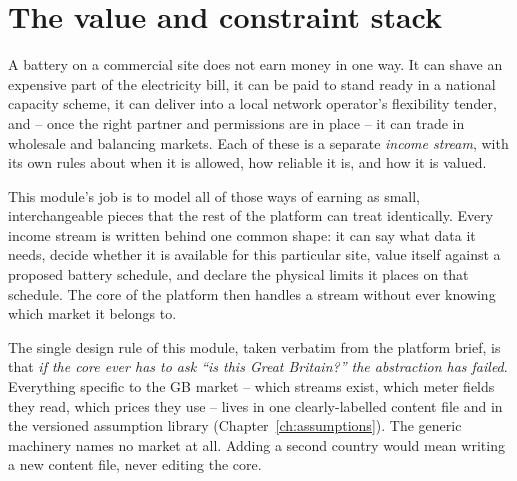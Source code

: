 \chapter{The value and constraint stack}
\label{ch:valuestack}


A battery on a commercial site does not earn money in one way. It can shave an expensive part of the electricity bill, it can be paid to stand ready in a national capacity scheme, it can deliver into a local network operator's flexibility tender, and -- once the right partner and permissions are in place -- it can trade in wholesale and balancing markets. Each of these is a separate \emph{income stream}, with its own rules about when it is allowed, how reliable it is, and how it is valued.

This module's job is to model all of those ways of earning as small, interchangeable pieces that the rest of the platform can treat identically. Every income stream is written behind one common shape: it can say what data it needs, decide whether it is available for this particular site, value itself against a proposed battery schedule, and declare the physical limits it places on that schedule. The core of the platform then handles a stream without ever knowing which market it belongs to.

\begin{plainnote}
The single design rule of this module, taken verbatim from the platform brief, is that \emph{if the core ever has to ask ``is this Great Britain?'' the abstraction has failed}. Everything specific to the GB market -- which streams exist, which meter fields they read, which prices they use -- lives in one clearly-labelled content file and in the versioned assumption library (Chapter~\ref{ch:assumptions}). The generic machinery names no market at all. Adding a second country would mean writing a new content file, never editing the core.
\end{plainnote}


